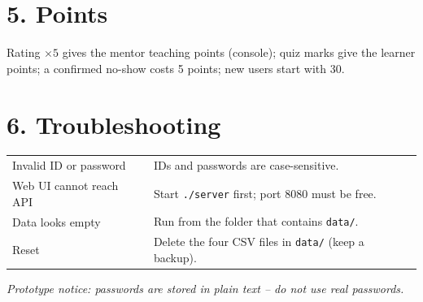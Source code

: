 \documentclass[10pt,a4paper]{article}
\begin{document}
\section*{5. Points}
Rating $\times5$ gives the mentor teaching points (console); quiz marks give the learner points; a confirmed no-show costs 5 points; new users start with 30.
\section*{6. Troubleshooting}
\begin{tabular}{@{}p{5cm}p{11cm}@{}}\toprule
Invalid ID or password & IDs and passwords are case-sensitive.\\
Web UI cannot reach API & Start \texttt{./server} first; port 8080 must be free.\\
Data looks empty & Run from the folder that contains \texttt{data/}.\\
Reset & Delete the four CSV files in \texttt{data/} (keep a backup).\\\bottomrule
\end{tabular}

\smallskip\noindent\textit{Prototype notice: passwords are stored in plain text -- do not use real passwords.}
\end{document}
